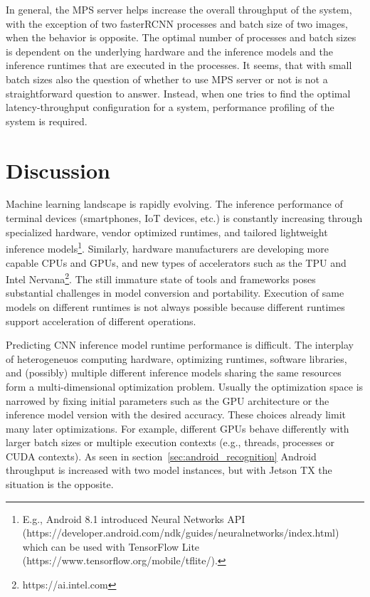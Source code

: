 \documentclass[sigconf]{acmart}
\begin{document}
In general, the MPS server helps increase the overall throughput of the system, with the exception of two fasterRCNN processes and batch size of two images, when the behavior is opposite. The optimal number of processes and batch sizes is dependent on the underlying hardware and the inference models and the inference runtimes that are executed in the processes. It seems, that with small batch sizes also the question of whether to use MPS server or not is not a straightforward question to answer. Instead, when one tries to find the optimal latency-throughput configuration for a system, performance profiling of the system is required.



\section{Discussion}\label{sec:discussion}

Machine learning landscape is rapidly evolving. The inference performance of terminal devices (smartphones, IoT devices, etc.) is constantly increasing through specialized hardware, vendor optimized runtimes, and tailored lightweight inference models\footnote{E.g., Android 8.1 introduced Neural Networks API (https://developer.android.com/ndk/guides/neuralnetworks/index.html) which can be used with TensorFlow Lite (https://www.tensorflow.org/mobile/tflite/).}. Similarly, hardware manufacturers are developing more capable CPUs and GPUs, and new types of accelerators such as the TPU and Intel Nervana\footnote{https://ai.intel.com}.
The still immature state of tools and frameworks poses substantial challenges in model conversion and portability. Execution of same models on different runtimes is not always possible because different runtimes support acceleration of different operations.

Predicting CNN inference model runtime performance is difficult. The interplay of heterogeneuos computing hardware, optimizing runtimes, software libraries, and (possibly) multiple different inference models sharing the same resources form a multi-dimensional optimization problem.
Usually the optimization space is narrowed by fixing initial parameters such as the GPU architecture or the inference model version with the desired accuracy. These choices already limit many later optimizations. For example, different GPUs behave differently with larger batch sizes or multiple execution contexts (e.g., threads, processes or CUDA contexts). As seen in section~\ref{sec:android_recognition}
Android throughput is increased with two model instances, but with Jetson TX the situation is the opposite.
\end{document}
